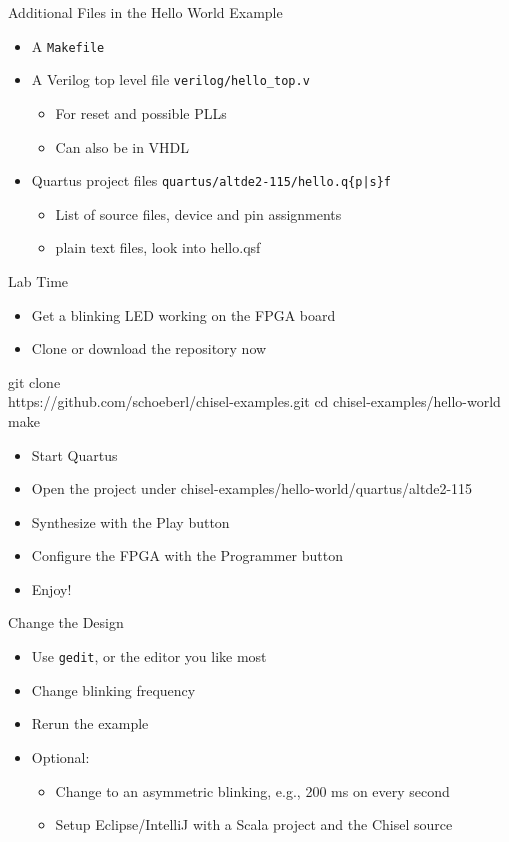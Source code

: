 \documentclass[xcolor=pdflatex,dvipsnames,table]{beamer}
\newcommand{\code}[1]{{\texttt{#1}}}
\begin{document}
\begin{frame}[fragile]{Additional Files in the Hello World Example}
\begin{itemize}
\item A \code{Makefile}
\item A Verilog top level file \code{verilog/hello\_top.v}
\begin{itemize}
\item For reset and possible PLLs
\item Can also be in VHDL
\end{itemize}
\item Quartus project files \code{quartus/altde2-115/hello.q\{p|s\}f}
\begin{itemize}
\item List of source files, device and pin assignments
\item plain text files, look into hello.qsf
\end{itemize}
\end{itemize}
\end{frame}

\begin{frame}[fragile]{Lab Time}
\begin{itemize}
\item Get a blinking LED working on the FPGA board
\item Clone or download the repository now
\end{itemize}
\begin{chisel}
git clone \\
   https://github.com/schoeberl/chisel-examples.git
cd chisel-examples/hello-world
make
\end{chisel}
\begin{itemize}
\item Start Quartus
\item Open the project under chisel-examples/hello-world/quartus/altde2-115
\item Synthesize with the Play button
\item Configure the FPGA with the Programmer button
\item Enjoy!
\end{itemize}
\end{frame}

\begin{frame}[fragile]{Change the Design}
\begin{itemize}
\item Use \code{gedit}, or the editor you like most
\item Change blinking frequency
\item Rerun the example
\item Optional:
\begin{itemize}
\item Change to an asymmetric blinking, e.g., 200 ms on every second 
\item Setup Eclipse/IntelliJ with a Scala project and the Chisel source
\end{itemize}
\end{itemize}
\end{frame}
\end{document}
